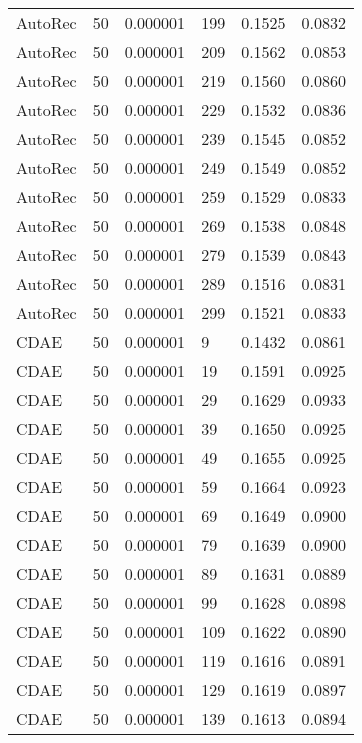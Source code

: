 \begin{tabular}{llrlrr}
 AutoRec &   50 &  0.000001 &   199 &  0.1525 &       0.0832 \\
 AutoRec &   50 &  0.000001 &   209 &  0.1562 &       0.0853 \\
 AutoRec &   50 &  0.000001 &   219 &  0.1560 &       0.0860 \\
 AutoRec &   50 &  0.000001 &   229 &  0.1532 &       0.0836 \\
 AutoRec &   50 &  0.000001 &   239 &  0.1545 &       0.0852 \\
 AutoRec &   50 &  0.000001 &   249 &  0.1549 &       0.0852 \\
 AutoRec &   50 &  0.000001 &   259 &  0.1529 &       0.0833 \\
 AutoRec &   50 &  0.000001 &   269 &  0.1538 &       0.0848 \\
 AutoRec &   50 &  0.000001 &   279 &  0.1539 &       0.0843 \\
 AutoRec &   50 &  0.000001 &   289 &  0.1516 &       0.0831 \\
 AutoRec &   50 &  0.000001 &   299 &  0.1521 &       0.0833 \\
    CDAE &   50 &  0.000001 &     9 &  0.1432 &       0.0861 \\
    CDAE &   50 &  0.000001 &    19 &  0.1591 &       0.0925 \\
    CDAE &   50 &  0.000001 &    29 &  0.1629 &       0.0933 \\
    CDAE &   50 &  0.000001 &    39 &  0.1650 &       0.0925 \\
    CDAE &   50 &  0.000001 &    49 &  0.1655 &       0.0925 \\
    CDAE &   50 &  0.000001 &    59 &  0.1664 &       0.0923 \\
    CDAE &   50 &  0.000001 &    69 &  0.1649 &       0.0900 \\
    CDAE &   50 &  0.000001 &    79 &  0.1639 &       0.0900 \\
    CDAE &   50 &  0.000001 &    89 &  0.1631 &       0.0889 \\
    CDAE &   50 &  0.000001 &    99 &  0.1628 &       0.0898 \\
    CDAE &   50 &  0.000001 &   109 &  0.1622 &       0.0890 \\
    CDAE &   50 &  0.000001 &   119 &  0.1616 &       0.0891 \\
    CDAE &   50 &  0.000001 &   129 &  0.1619 &       0.0897 \\
    CDAE &   50 &  0.000001 &   139 &  0.1613 &       0.0894 \\

\end{tabular}
